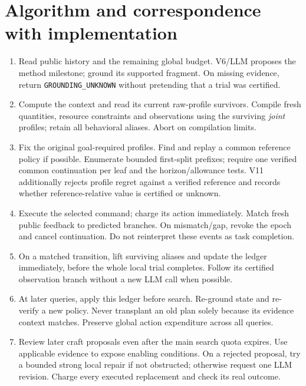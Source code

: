 \documentclass[11pt]{article}
\theoremstyle{definition}
\begin{document}
\section{Algorithm and correspondence with implementation}
\begin{enumerate}[label=\arabic*.,leftmargin=*]
\item Read public history and the remaining global budget. V6/LLM proposes the
method milestone; ground its supported fragment. On missing evidence, return
\texttt{GROUNDING\_UNKNOWN} without pretending that a trial was certified.
\item Compute the context and read its current raw-profile survivors. Compile
fresh quantities, resource constraints and observations using the surviving
\emph{joint} profiles; retain all behavioral aliases. Abort on compilation limits.
\item Fix the original goal-required profiles. Find and replay a common reference
policy if possible. Enumerate bounded first-split prefixes; require one verified
common continuation per leaf and the horizon/allowance tests.
V11 additionally rejects profile regret against a verified reference and
records whether reference-relative value is certified or unknown.
\item Execute the selected command; charge its action immediately. Match fresh
public feedback to predicted branches. On mismatch/gap, revoke the epoch and
cancel continuation. Do not reinterpret these events as task completion.
\item On a matched transition, lift surviving aliases and update the ledger
immediately, before the whole local trial completes. Follow its certified
observation branch without a new LLM call when possible.
\item At later queries, apply this ledger before search. Re-ground state and
re-verify a new policy. Never transplant an old plan solely because its evidence
context matches. Preserve global action expenditure across all queries.
\item Review later craft proposals even after the main search quota expires.
Use applicable evidence to expose enabling conditions. On a rejected proposal,
try a bounded strong local repair if not obstructed; otherwise request one LLM
revision. Charge every executed replacement and check its real outcome.
\end{enumerate}
\end{document}
